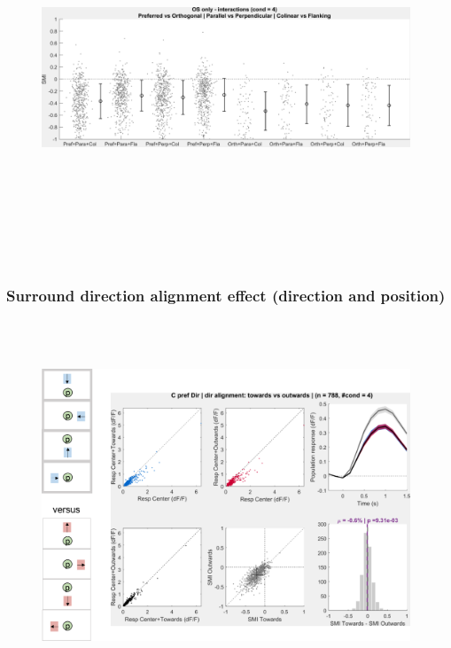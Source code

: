 \begin{figure}[H] \centering \includegraphics[width=11cm,height=11cm,keepaspectratio]{Figures/7.Results/population/sel/31_popPlots_VisROIs_COS_2SalignmentAngle.png} 
\end{figure}

\subsubsection{Surround direction alignment effect (direction and position)}

\begin{figure}[H] \centering \includegraphics[width=11cm,height=11cm,keepaspectratio]{Figures/7.Results/population/sel/diagrams/17.png} 
\end{figure}

